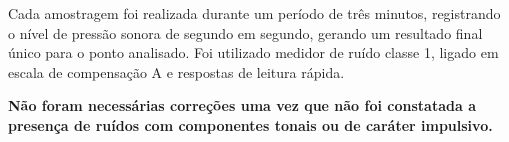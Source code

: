 \begin{SingleSpace}
Cada amostragem foi realizada durante um período de três minutos, registrando o nível de pressão sonora de segundo em segundo, gerando um resultado final único para o ponto analisado. Foi utilizado medidor de ruído classe 1, ligado em escala de compensação A e respostas de leitura rápida.

\textbf{Não foram necessárias correções uma vez que não foi constatada a presença de ruídos com componentes tonais ou de caráter impulsivo.}


\end{SingleSpace}



